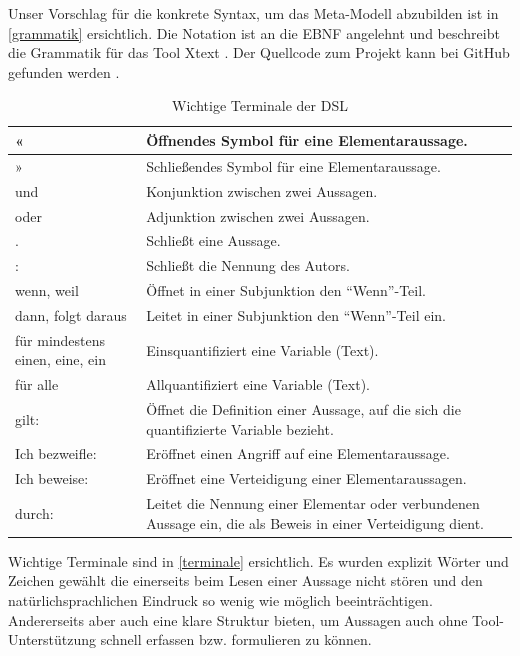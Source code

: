 \documentclass[11pt,a4paper,bibtotocnumbered]{scrreprt}
\begin{document}
Unser Vorschlag für die konkrete Syntax, um das Meta-Modell abzubilden ist in \autoref{grammatik} ersichtlich.
Die Notation ist an die \ac{EBNF} angelehnt und beschreibt die Grammatik für das Tool Xtext \cite{Xtext}.
Der Quellcode zum Projekt kann bei GitHub gefunden werden \cite{GitHubCode}.

\begin{table}[htbp]
\centering
\caption{Wichtige Terminale der DSL}
\label{terminale}
\begin{tabularx}{\textwidth}{|p{3cm}|X|}
\hline
« 				& Öffnendes Symbol für eine Elementaraussage.  \\ \hline
» 				& Schließendes Symbol für eine Elementaraussage.  \\ \hline
und  			& Konjunktion zwischen zwei Aussagen.   \\  \hline
oder  		& Adjunktion zwischen zwei Aussagen.   \\  \hline
.     			& Schließt eine Aussage.   \\  \hline
:				& Schließt die Nennung des Autors.   \\  \hline
wenn, weil	& Öffnet in einer Subjunktion den \enquote{Wenn}-Teil.   \\  \hline
dann, folgt daraus	& Leitet in einer Subjunktion den \enquote{Wenn}-Teil ein.   \\  \hline
für mindestens einen, eine, ein & Einsquantifiziert eine Variable (Text).   \\  \hline
für alle & Allquantifiziert eine Variable (Text).   \\  \hline
gilt:				& Öffnet die Definition einer Aussage, auf die sich die quantifizierte Variable bezieht.   \\  \hline
Ich bezweifle:		& Eröffnet einen Angriff auf eine Elementaraussage.   \\  \hline
Ich beweise:		& Eröffnet eine Verteidigung einer Elementaraussagen.   \\  \hline
durch:		& Leitet die Nennung einer Elementar oder verbundenen Aussage ein, die als Beweis in einer Verteidigung dient.   \\  \hline
\end{tabularx}
\end{table}

Wichtige Terminale sind in \autoref{terminale} ersichtlich.
Es wurden explizit Wörter und Zeichen gewählt die einerseits beim Lesen einer Aussage nicht stören und den natürlichsprachlichen Eindruck so wenig wie möglich beeinträchtigen. Andererseits aber auch eine klare Struktur bieten, um Aussagen auch ohne Tool-Unterstützung schnell erfassen bzw. formulieren zu können.
\end{document}
